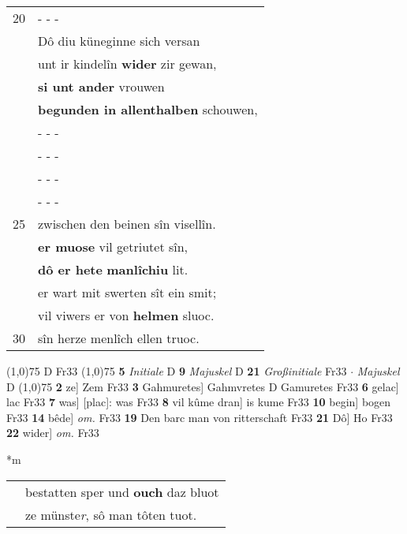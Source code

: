 \documentclass[8pt,a4paper,notitlepage]{article}
\begin{document}
\begin{table}[ht]
\begin{minipage}[t]{0.5\linewidth}
\begin{tabular}{rl}
20 & \multicolumn{1}{l}{ - - - }\\ 
 & Dô diu küneginne sich versan\\ 
 & unt ir kindelîn \textbf{wider} zir gewan,\\ 
 & \textbf{si unt ander} vrouwen\\ 
 & \textbf{begunden in allenthalben} schouwen,\\ 
 & \multicolumn{1}{l}{ - - - }\\ 
 & \multicolumn{1}{l}{ - - - }\\ 
 & \multicolumn{1}{l}{ - - - }\\ 
 & \multicolumn{1}{l}{ - - - }\\ 
25 & zwischen den beinen sîn visellîn.\\ 
 & \textbf{er muose} vil getriutet sîn,\\ 
 & \textbf{dô er hete} \textbf{manlîchiu} lit.\\ 
 & er wart mit swerten sît ein smit;\\ 
 & vil viwers er von \textbf{helmen} sluoc.\\ 
30 & sîn herze menlîch ellen truoc.\\ 
\end{tabular}
\scriptsize
\line(1,0){75} \newline
D Fr33 \newline
\line(1,0){75} \newline
\textbf{5} \textit{Initiale} D  \textbf{9} \textit{Majuskel} D  \textbf{21} \textit{Großinitiale} Fr33   $\cdot$ \textit{Majuskel} D  \newline
\line(1,0){75} \newline
\textbf{2} ze] Zem Fr33 \textbf{3} Gahmuretes] Gahmvretes D Gamuretes Fr33 \textbf{6} gelac] lac Fr33 \textbf{7} was] [plac]: was Fr33 \textbf{8} vil kûme dran] is kume Fr33 \textbf{10} begin] bogen Fr33 \textbf{14} bêde] \textit{om.} Fr33 \textbf{19} Den barc man von ritterschaft Fr33 \textbf{21} Dô] Ho Fr33 \textbf{22} wider] \textit{om.} Fr33 \newline
\end{minipage}
\hspace{0.5cm}
\begin{minipage}[t]{0.5\linewidth}
\small
\begin{center}*m
\end{center}
\begin{tabular}{rl}
 & bestatten sper und \textbf{ouch} daz bluot\\ 
 & ze münste\textit{r}, sô man tôten tuot.\\ 

\end{tabular}
\end{minipage}
\end{table}
\end{document}
